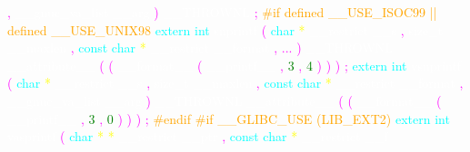 \textcolor{magenta}{,} 
\textcolor{white}{\_\_gnuc\_va\_list} 
\textcolor{white}{\_\_arg} 
\textcolor{magenta}{)} 
\textcolor{white}{\_\_THROWNL} 
\textcolor{magenta}{;} 
\textcolor{orange}{\#if defined \_\_USE\_ISOC99 || defined \_\_USE\_UNIX98} 
\textcolor{cyan}{extern} 
\textcolor{cyan}{int} 
\textcolor{white}{snprintf} 
\textcolor{magenta}{(} 
\textcolor{cyan}{char} 
\textcolor{yellow}{*} 
\textcolor{white}{\_\_restrict} 
\textcolor{white}{\_\_s} 
\textcolor{magenta}{,} 
\textcolor{white}{size\_t} 
\textcolor{white}{\_\_maxlen} 
\textcolor{magenta}{,} 
\textcolor{cyan}{const} 
\textcolor{cyan}{char} 
\textcolor{yellow}{*} 
\textcolor{white}{\_\_restrict} 
\textcolor{white}{\_\_format} 
\textcolor{magenta}{,} 
\textcolor{magenta}{...} 
\textcolor{magenta}{)} 
\textcolor{white}{\_\_THROWNL} 
\textcolor{white}{\_\_attribute\_\_} 
\textcolor{magenta}{(} 
\textcolor{magenta}{(} 
\textcolor{white}{\_\_format\_\_} 
\textcolor{magenta}{(} 
\textcolor{white}{\_\_printf\_\_} 
\textcolor{magenta}{,} 
\textcolor{green}{3} 
\textcolor{magenta}{,} 
\textcolor{green}{4} 
\textcolor{magenta}{)} 
\textcolor{magenta}{)} 
\textcolor{magenta}{)} 
\textcolor{magenta}{;} 
\textcolor{cyan}{extern} 
\textcolor{cyan}{int} 
\textcolor{white}{vsnprintf} 
\textcolor{magenta}{(} 
\textcolor{cyan}{char} 
\textcolor{yellow}{*} 
\textcolor{white}{\_\_restrict} 
\textcolor{white}{\_\_s} 
\textcolor{magenta}{,} 
\textcolor{white}{size\_t} 
\textcolor{white}{\_\_maxlen} 
\textcolor{magenta}{,} 
\textcolor{cyan}{const} 
\textcolor{cyan}{char} 
\textcolor{yellow}{*} 
\textcolor{white}{\_\_restrict} 
\textcolor{white}{\_\_format} 
\textcolor{magenta}{,} 
\textcolor{white}{\_\_gnuc\_va\_list} 
\textcolor{white}{\_\_arg} 
\textcolor{magenta}{)} 
\textcolor{white}{\_\_THROWNL} 
\textcolor{white}{\_\_attribute\_\_} 
\textcolor{magenta}{(} 
\textcolor{magenta}{(} 
\textcolor{white}{\_\_format\_\_} 
\textcolor{magenta}{(} 
\textcolor{white}{\_\_printf\_\_} 
\textcolor{magenta}{,} 
\textcolor{green}{3} 
\textcolor{magenta}{,} 
\textcolor{green}{0} 
\textcolor{magenta}{)} 
\textcolor{magenta}{)} 
\textcolor{magenta}{)} 
\textcolor{magenta}{;} 
\textcolor{orange}{\#endif} 
\textcolor{orange}{\#if \_\_GLIBC\_USE (LIB\_EXT2)} 
\textcolor{cyan}{extern} 
\textcolor{cyan}{int} 
\textcolor{white}{vasprintf} 
\textcolor{magenta}{(} 
\textcolor{cyan}{char} 
\textcolor{yellow}{*} 
\textcolor{yellow}{*} 
\textcolor{white}{\_\_restrict} 
\textcolor{white}{\_\_ptr} 
\textcolor{magenta}{,} 
\textcolor{cyan}{const} 
\textcolor{cyan}{char} 
\textcolor{yellow}{*} 
\textcolor{white}{\_\_restrict} 
\textcolor{white}{\_\_f} 
